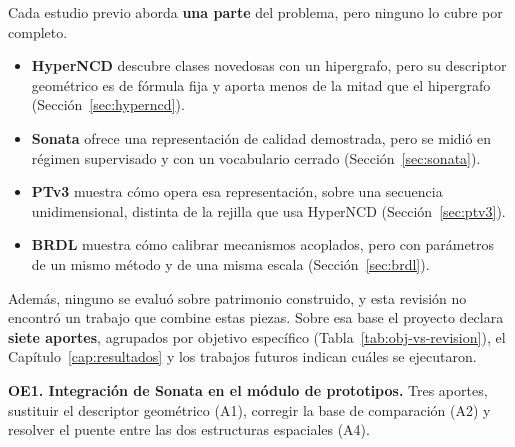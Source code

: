 Cada estudio previo aborda \textbf{una parte} del problema, pero ninguno lo cubre
por completo.

\begin{itemize}\setlength{\itemsep}{2pt}
\item \textbf{HyperNCD} descubre clases novedosas con un hipergrafo, pero su
descriptor geométrico es de fórmula fija y aporta menos de la mitad que el
hipergrafo (Sección~\ref{sec:hyperncd}).
\item \textbf{Sonata} ofrece una representación de calidad demostrada, pero se
midió en régimen supervisado y con un vocabulario cerrado
(Sección~\ref{sec:sonata}).
\item \textbf{PTv3} muestra cómo opera esa representación, sobre una secuencia
unidimensional, distinta de la rejilla que usa HyperNCD
(Sección~\ref{sec:ptv3}).
\item \textbf{BRDL} muestra cómo calibrar mecanismos acoplados, pero con
parámetros de un mismo método y de una misma escala (Sección~\ref{sec:brdl}).
\end{itemize}

Además, ninguno se evaluó sobre patrimonio construido, y esta revisión no
encontró un trabajo que combine estas piezas. Sobre esa base el proyecto declara
\textbf{siete aportes}, agrupados por objetivo específico
(Tabla~\ref{tab:obj-vs-revision}), el Capítulo~\ref{cap:resultados} y los
trabajos futuros indican cuáles se ejecutaron.

\medskip
\noindent\textbf{OE1. Integración de Sonata en el módulo de prototipos.}
Tres aportes, sustituir el descriptor geométrico (A1), corregir la base de
comparación (A2) y resolver el puente entre las dos estructuras espaciales (A4).

